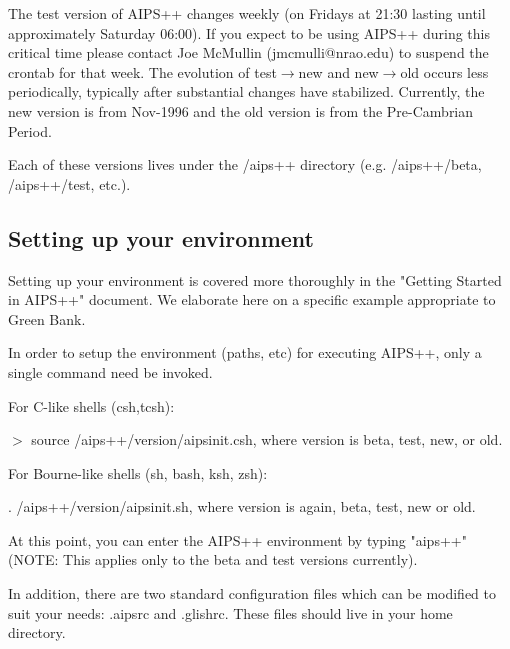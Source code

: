 The test version of AIPS++ changes weekly (on Fridays at 21:30 lasting until
approximately Saturday 06:00). If you expect to be using AIPS++ during this critical time
please contact Joe McMullin (jmcmulli@nrao.edu) to suspend the crontab
for that week. The evolution of test$\rightarrow$new and
new$\rightarrow$old occurs less periodically, typically after substantial
changes have stabilized.
Currently, the new version is from Nov-1996 and the old version is from
the Pre-Cambrian Period.

Each of these versions lives under the /aips++ directory (e.g. /aips++/beta,
/aips++/test, etc.).


\bigskip
\subsection{Setting up your environment}


Setting up your environment is covered more thoroughly in the "Getting
Started in AIPS++" document. We elaborate here on a specific example
appropriate to Green Bank.

In order to setup the environment (paths, etc) for executing AIPS++,
only a single command need be invoked.

For C-like shells (csh,tcsh):

$>$ source /aips++/version/aipsinit.csh, where version is beta, test, new,
	or old.

For Bourne-like shells (sh, bash, ksh, zsh):

. /aips++/version/aipsinit.sh, where version is again, beta, test, new or old.

At this point, you can enter the AIPS++ environment by typing "aips++" 
(NOTE: This applies only to the beta and test versions currently).

In addition, there are two standard configuration files which can
be modified to suit your needs: .aipsrc and .glishrc. These files
should live in your home directory.

